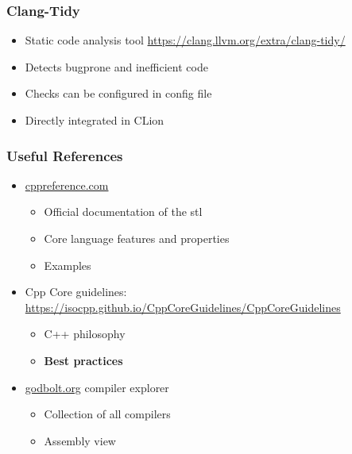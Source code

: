 \documentclass[usenames,dvipsnames,svgnames,table,aspectratio=169]{beamer}
\begin{document}
\begin{frame}
    \frametitle{Clang-Tidy}
    \begin{itemize}
        \item<+-> Static code analysis tool \url{https://clang.llvm.org/extra/clang-tidy/}
        \item<+-> Detects bugprone and inefficient code
        \item<+-> Checks can be configured in config file
        \item<+-> Directly integrated in CLion
    \end{itemize}
\end{frame}

\begin{frame}
    \frametitle{Useful References}
    \begin{itemize}
        \item<+-> \url{cppreference.com}
        \begin{itemize}
            \item<+-> Official documentation of the stl
            \item<+-> Core language features and properties
            \item<+-> Examples
        \end{itemize}
        \item<+-> Cpp Core guidelines: \url{https://isocpp.github.io/CppCoreGuidelines/CppCoreGuidelines}
        \begin{itemize}
            \item<+-> C++ philosophy
            \item<+-> \textbf{Best practices}
        \end{itemize}
        \item<+-> \url{godbolt.org} compiler explorer
        \begin{itemize}
            \item<+-> Collection of all compilers
            \item<+-> Assembly view
        \end{itemize}
    \end{itemize}
\end{frame}
\end{document}
